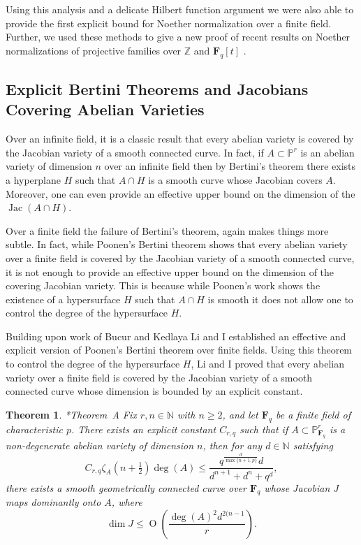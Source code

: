 \documentclass[10pt,reqno]{amsart}
\newtheorem{theorem}[lemma]{Theorem}
\theoremstyle{remark}
\newcommand{\Jac}{\operatorname{Jac}}
\newcommand{\fF}{\mathbf F}
\newcommand{\OO}{\operatorname{O}}
\newcommand{\N}{\mathbb{N}}
\renewcommand{\P}{\mathbb{P}}
\newcommand{\Z}{\mathbb{Z}}
\begin{document}
Using this analysis and a delicate Hilbert function argument we were also able to provide the first explicit bound for Noether normalization over a finite field. Further, we used these methods to give a new proof of recent results on Noether normalizations of projective families over $\Z$ and $\fF_{q}[t]$ \cite{gabberLiuLorenzini15, cmbpt}.



\subsection{Explicit Bertini Theorems and Jacobians Covering Abelian Varieties}

Over an infinite field, it is a classic result that every abelian variety is covered by the Jacobian variety of a smooth connected curve. In fact, if $A\subset \P^r$ is an abelian variety of dimension $n$ over an infinite field then by Bertini's theorem there exists a hyperplane $H$ such that $A\cap H$ is a smooth curve whose Jacobian covers $A$. Moreover, one can even provide an effective upper bound on the dimension of the $\Jac(A\cap H)$.

Over a finite field the failure of Bertini's theorem, again makes things more subtle. In fact, while Poonen's Bertini theorem shows that every abelian variety over a finite field is covered by the Jacobian variety of a smooth connected curve, it is not enough to provide an effective upper bound on the dimension of the covering Jacobian variety. This is because while Poonen's work shows the existence of a hypersurface $H$ such that $A\cap H$ is smooth it does not allow one to control the degree of the hypersurface $H$. 

Building upon work of Bucur and Kedlaya \cite{bucurKedlaya12} Li and I established an effective and explicit version of Poonen's Bertini theorem over finite fields. Using this theorem to control the degree of the hypersurface $H$, Li and I proved that every abelian variety over a finite field is covered by the Jacobian variety of a smooth connected curve whose dimension is bounded by an explicit constant. 

\begin{theorem}\cite{bruceLi19}*{Theorem~A}
Fix $r,n\in \N$ with $n\geq2$, and let $\fF_{q}$ be a finite field of characteristic $p$. There exists an explicit constant $C_{r,q}$ such that if $A\subset \P^{r}_{\fF_q}$ is a non-degenerate abelian variety of dimension $n$, then for any $d\in \N$ satisfying 
\[
C_{r,q}\zeta_{A}\left(n+\tfrac{1}{2}\right) \deg(A) \leq  \frac{q^{\frac{d}{\max\{n+1,p\}}}d}{d^{n+1}+d^n+q^{d}},
\]
there exists a smooth geometrically connected curve over $\fF_{q}$ whose Jacobian $J$ maps dominantly onto $A$, where 
\[
\dim J\leq 
\OO\left(\frac{ \deg(A)^2 d^{2(n-1}}{r}\right).
\]
\end{theorem} 
\end{document}
